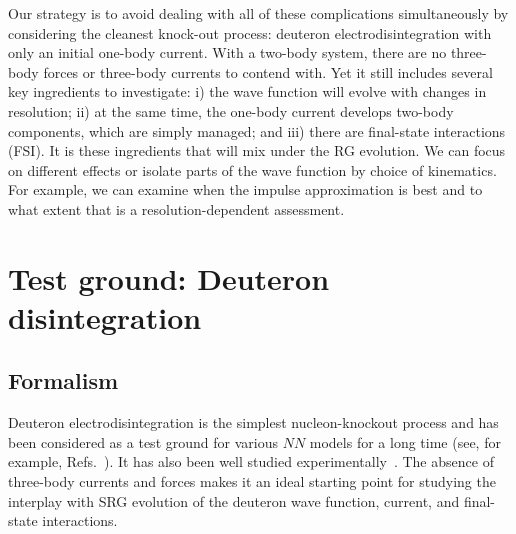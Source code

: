 	Our strategy is to avoid dealing with all of these complications
	simultaneously
	by considering the cleanest knock-out process: deuteron electrodisintegration
	with only an initial one-body current.  With a two-body system, there are no
	three-body forces or three-body currents to contend with.  Yet it still
	includes several key ingredients to investigate: i) the wave function will
	evolve with changes in resolution; ii) at the same time, the one-body current
	develops two-body components, which are simply managed; and iii) there are
	final-state interactions (FSI).  It is these ingredients that will mix under
	the RG evolution.  We can focus on different effects or isolate parts of the
	wave function by choice of kinematics.  For example, we can examine when the
	impulse approximation is best and to what extent that is a
	resolution-dependent assessment.


	\section{Test ground: Deuteron disintegration}

	\subsection{Formalism}

	Deuteron electrodisintegration is the simplest nucleon-knockout process
	and has been considered as a test ground for various $NN$ models for a
	long time (see, for example, Refs.~\cite{Arenhovel:2004bc,Boeglin:2015cha}).
	It has also been well studied
	experimentally~\cite{Gilad:1998wia,Egiyan:2007qj}.
	The absence of three-body currents and forces
	makes it an ideal starting point for studying the interplay with SRG evolution
	of the deuteron wave function, current, and final-state interactions.

